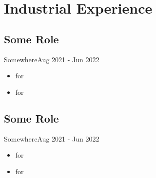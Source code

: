 \section{Industrial Experience}
\subsection{Some Role}{Somewhere}{Aug 2021 - Jun 2022}
\begin{itemize}
    \item \lipsum[2][2] \emph{\lipsum[2][1]} for \textbf{\lipsum[5][1]} \lipsum[1][1] \textbf{\lipsum[4][4]} 
    \item \lipsum[2][2] \emph{\lipsum[2][1]} for \textbf{\lipsum[5][1]} \lipsum[1][1] \textbf{\lipsum[4][4]} 
\end{itemize}
\subsection{Some Role}{Somewhere}{Aug 2021 - Jun 2022}
\begin{itemize}
    \item \lipsum[2][2] \emph{\lipsum[2][1]} for \textbf{\lipsum[5][1]} \lipsum[1][1] \textbf{\lipsum[4][4]} 
    \item \lipsum[2][2] \emph{\lipsum[2][1]} for \textbf{\lipsum[5][1]} \lipsum[1][1] \textbf{\lipsum[4][4]} 
\end{itemize}


